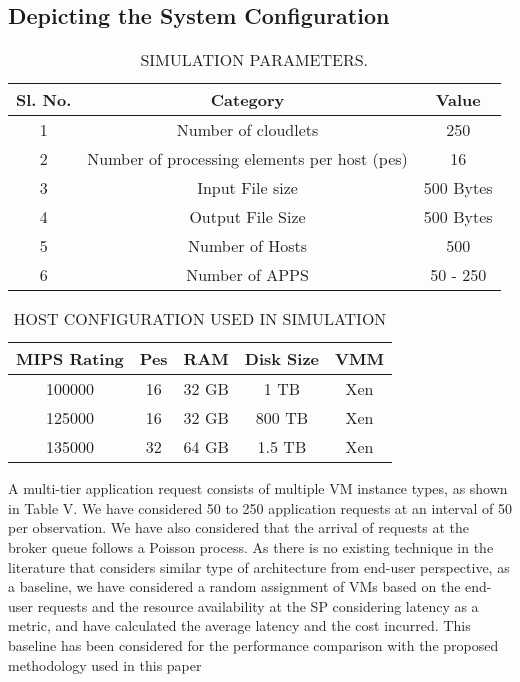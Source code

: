 \documentclass[conference]{IEEEtran}
\newcommand\tab[1][0.8cm]{\hspace*{#1}}
\begin{document}
\subsection{Depicting the System Configuration}
\begin{table}[htbp!]
	\caption{SIMULATION PARAMETERS.}
	\begin{center}
		\begin{tabular}{|c|c|c|}
			\hline
		Sl. No. & Category & Value\\
			\hline
		1 & Number of cloudlets& 250 \\
			\hline
			2 & Number of processing elements per host (pes) & 16\\
			\hline
			3 & Input File size & 500 Bytes \\
			\hline
				4 & Output File Size & 500 Bytes \\
			
			\hline
			5 & Number of Hosts & 500  \\
			\hline
			6 & Number of APPS & 50 - 250 \\
			\hline
			
		\end{tabular}
		\label{tab1}
	\end{center}
\end{table}

\begin{table}[htbp!]
	\caption{HOST CONFIGURATION USED IN SIMULATION}
	\begin{center}
		\begin{tabular}{|c|c|c|c|c|}
			\hline
			MIPS Rating & Pes & RAM & Disk Size & VMM\\
			\hline
			100000 & 16 & 32 GB & 1 TB & Xen \\
			\hline
			125000 & 16 & 32 GB & 800 TB & Xen\\
			\hline
			135000 & 32 & 64 GB & 1.5 TB & Xen \\
				\hline
		\end{tabular}
		\label{tab1}
	\end{center}
\end{table}
\tab A multi-tier
application request consists of multiple VM instance types, as
shown in Table V. We have considered 50 to 250 application
requests at an interval of 50 per observation. We have also
considered that the arrival of requests at the broker queue
follows a Poisson process. As there is no existing technique
in the literature that considers similar type of architecture
from end-user perspective, as a baseline, we have considered
a random assignment of VMs based on the end-user requests
and the resource availability at the SP considering latency
as a metric, and have calculated the average latency and
the cost incurred. This baseline has been considered for the
performance comparison with the proposed methodology used
in this paper
\end{document}
